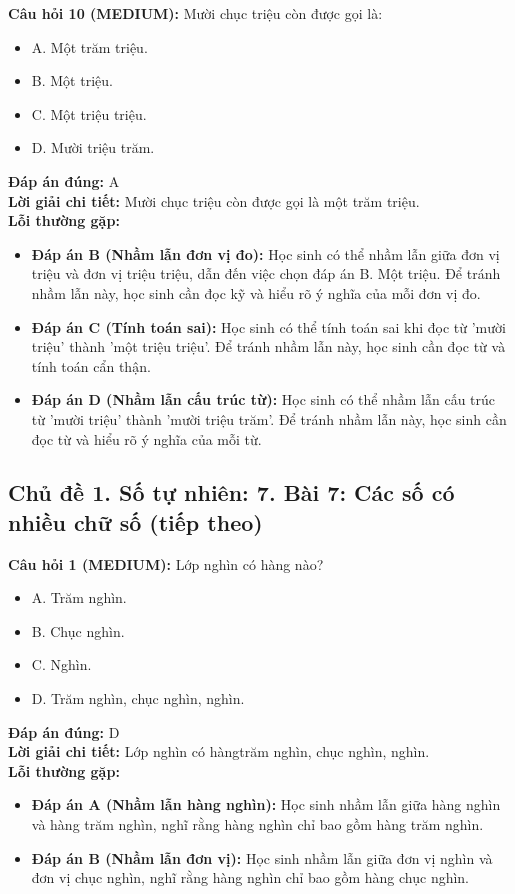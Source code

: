 \documentclass{article}
\begin{document}
\begin{minipage}{\textwidth}
\noindent\textbf{Câu hỏi 10 (MEDIUM):} Mười chục triệu còn được gọi là: 
\begin{itemize}[label={}]
    \item A. Một trăm triệu.
    \item B. Một triệu.
    \item C. Một triệu triệu.
    \item D. Mười triệu trăm.
\end{itemize}
\textbf{Đáp án đúng:} A \\
\textbf{Lời giải chi tiết:} Mười chục triệu còn được gọi là một trăm triệu. \\
\textbf{Lỗi thường gặp:}
\begin{itemize}
  \item \textbf{Đáp án B (Nhầm lẫn đơn vị đo):} Học sinh có thể nhầm lẫn giữa đơn vị triệu và đơn vị triệu triệu, dẫn đến việc chọn đáp án B. Một triệu. Để tránh nhầm lẫn này, học sinh cần đọc kỹ và hiểu rõ ý nghĩa của mỗi đơn vị đo.
  \item \textbf{Đáp án C (Tính toán sai):} Học sinh có thể tính toán sai khi đọc từ 'mười triệu' thành 'một triệu triệu'. Để tránh nhầm lẫn này, học sinh cần đọc từ và tính toán cẩn thận.
  \item \textbf{Đáp án D (Nhầm lẫn cấu trúc từ):} Học sinh có thể nhầm lẫn cấu trúc từ 'mười triệu' thành 'mười triệu trăm'. Để tránh nhầm lẫn này, học sinh cần đọc từ và hiểu rõ ý nghĩa của mỗi từ.
\end{itemize}
\end{minipage}
\vspace{1em}

\subsection{Chủ đề 1. Số tự nhiên: 7. Bài 7: Các số có nhiều chữ số (tiếp theo)}
\begin{minipage}{\textwidth}
\noindent\textbf{Câu hỏi 1 (MEDIUM):} Lớp nghìn có hàng nào? 
\begin{itemize}[label={}]
    \item A. Trăm nghìn.
    \item B. Chục nghìn.
    \item C. Nghìn.
    \item D. Trăm nghìn, chục nghìn, nghìn.
\end{itemize}
\textbf{Đáp án đúng:} D \\
\textbf{Lời giải chi tiết:} Lớp nghìn có hàngtrăm nghìn, chục nghìn, nghìn. \\
\textbf{Lỗi thường gặp:}
\begin{itemize}
  \item \textbf{Đáp án A (Nhầm lẫn hàng nghìn):} Học sinh nhầm lẫn giữa hàng nghìn và hàng trăm nghìn, nghĩ rằng hàng nghìn chỉ bao gồm hàng trăm nghìn.
  \item \textbf{Đáp án B (Nhầm lẫn đơn vị):} Học sinh nhầm lẫn giữa đơn vị nghìn và đơn vị chục nghìn, nghĩ rằng hàng nghìn chỉ bao gồm hàng chục nghìn.
\end{itemize}
\end{minipage}
\vspace{1em}
\end{document}
